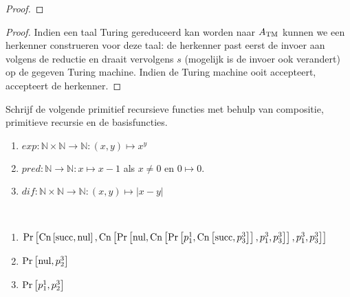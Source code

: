 \documentclass[a4paper]{article}
\newcommand{\prnul}[0]{\ensuremath{\mbox{nul}}}
\newcommand{\prsucc}[0]{\ensuremath{\mbox{succ}}}
\newcommand{\prp}[2]{\ensuremath{p_{#2}^{#1}}}
\newcommand{\prcn}[2]{\funmf{Cn}{#1,#2}}
\newcommand{\prpr}[2]{\funmf{Pr}{#1,#2}}
\newcommand{\N}{\mathbb{N}}
\begin{document}
\begin{question}
\begin{answer}
\begin{enumerate}
\begin{proof}
 \end{proof}
 \begin{proof}
  Indien een taal Turing gereduceerd kan worden naar $A_{\rm TM}$ kunnen we een herkenner construeren voor deze taal: de herkenner past eerst de invoer aan volgens de reductie en draait vervolgens $s$ (mogelijk is de invoer ook verandert) op de gegeven Turing machine. Indien de Turing machine ooit accepteert, accepteert de herkenner.
 \end{proof}
\end{enumerate}
\end{answer}
\end{question}

\begin{question}
Schrijf de volgende primitief recursieve functies met behulp van compositie, primitieve recursie en de basisfuncties.
\begin{enumerate}
  \item $exp : \N \times \N \to \N : (x,y) \mapsto x^y$
  \item $pred : \N \to \N : x \mapsto x - 1$ als $x \neq 0$ en $0 \mapsto 0$.
  \item $dif : \N \times \N \to \N : (x,y) \mapsto | x - y |$
\end{enumerate}
\begin{answer}~~
\begin{enumerate}
 \item $\prpr{\prcn{\prsucc}{\prnul}}{\prcn{\prpr{\prnul}{\prcn{\prpr{\prp{1}{1}}{\prcn{\prsucc}{\prp{3}{3}}}}{\prp{3}{1},\prp{3}{3}}}}{\prp{3}{1},\prp{3}{3}}}$
 \item $\prpr{\prnul}{\prp{3}{2}}$
 \item $\prpr{\prp{1}{1}}{\prp{3}{2}}$
\end{enumerate}
\end{answer}
\end{question}
\end{document}
